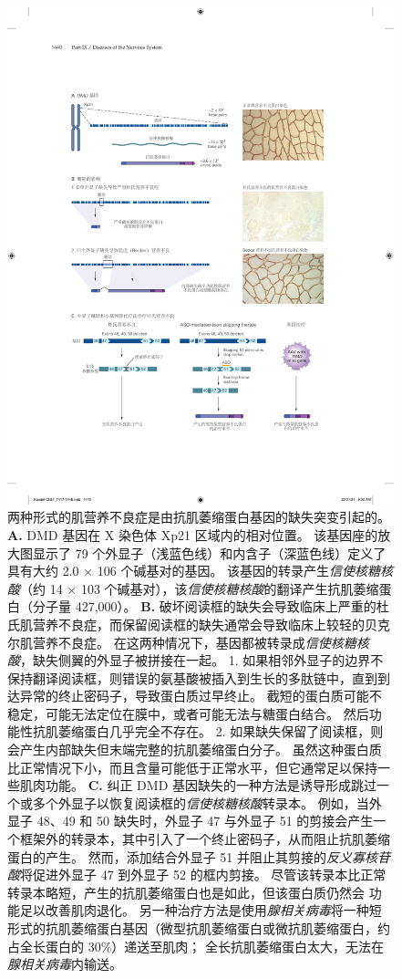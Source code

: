 \begin{figure}[htbp]
	\centering
	\includegraphics[width=0.85\linewidth]{chap57/fig_57_10}
	\caption{两种形式的肌营养不良症是由抗肌萎缩蛋白基因的缺失突变引起的\cite{hoffman1987dystrophin}。
		\textbf{A.} DMD 基因在 X 染色体 Xp21 区域内的相对位置。
		该基因座的放大图显示了 79 个外显子（浅蓝色线）和内含子（深蓝色线）定义了具有大约 2.0 × 106 个碱基对的基因。
		该基因的转录产生\textit{信使核糖核酸}（约 14 × 103 个碱基对），该\textit{信使核糖核酸}的翻译产生抗肌萎缩蛋白（分子量 427,000）。
		\textbf{B.} 破坏阅读框的缺失会导致临床上严重的杜氏肌营养不良症，而保留阅读框的缺失通常会导致临床上较轻的贝克尔肌营养不良症。
		在这两种情况下，基因都被转录成\textit{信使核糖核酸}，缺失侧翼的外显子被拼接在一起。
		1. 如果相邻外显子的边界不保持翻译阅读框，则错误的氨基酸被插入到生长的多肽链中，直到到达异常的终止密码子，导致蛋白质过早终止。
		截短的蛋白质可能不稳定，可能无法定位在膜中，或者可能无法与糖蛋白结合。
		然后功能性抗肌萎缩蛋白几乎完全不存在。
		2. 如果缺失保留了阅读框，则会产生内部缺失但末端完整的抗肌萎缩蛋白分子。
		虽然这种蛋白质比正常情况下小，而且含量可能低于正常水平，但它通常足以保持一些肌肉功能。
		\textbf{C.} 纠正 DMD 基因缺失的一种方法是诱导形成跳过一个或多个外显子以恢复阅读框的\textit{信使核糖核酸}转录本。
		例如，当外显子 48、49 和 50 缺失时，外显子 47 与外显子 51 的剪接会产生一个框架外的转录本，其中引入了一个终止密码子，从而阻止抗肌萎缩蛋白的产生。
		然而，添加结合外显子 51 并阻止其剪接的\textit{反义寡核苷酸}将促进外显子 47 到外显子 52 的框内剪接。
		尽管该转录本比正常转录本略短，产生的抗肌萎缩蛋白也是如此，但该蛋白质仍然会 功能足以改善肌肉退化。
		另一种治疗方法是使用\textit{腺相关病毒}将一种短形式的抗肌萎缩蛋白基因（微型抗肌萎缩蛋白或微抗肌萎缩蛋白，约占全长蛋白的 30\%）递送至肌肉；
		全长抗肌萎缩蛋白太大，无法在\textit{腺相关病毒}内输送。}
	\label{fig:57_10}
\end{figure}


